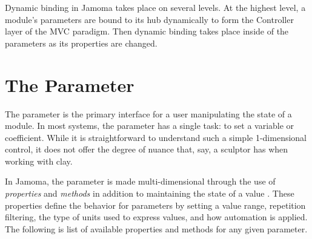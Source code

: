 \documentclass{article}
\begin{document}
Dynamic binding in Jamoma takes place on several levels.  At the highest level, a module's parameters are bound to its hub dynamically to form the Controller layer of the MVC paradigm.  Then dynamic binding takes place inside of the parameters as its properties are changed.

%
%




\section{The Parameter} %
\label{sec:the_parameter}

The parameter is the primary interface for a user manipulating the state of a module. In most systems, the parameter has a single task: to set a variable or coefficient. While it is straightforward to understand such a simple 1-dimensional control, it does not offer the degree of nuance that, say, a sculptor has when working with clay.

In Jamoma, the parameter is made multi-dimensional through the use of \emph{properties} and \emph{methods} in addition to maintaining the state of a value \cite{Place:2008}. These properties define the behavior for parameters by setting a value range, repetition filtering, the type of units used to express values, and how automation is applied. The following is list of available properties and methods for any given parameter.
\end{document}
